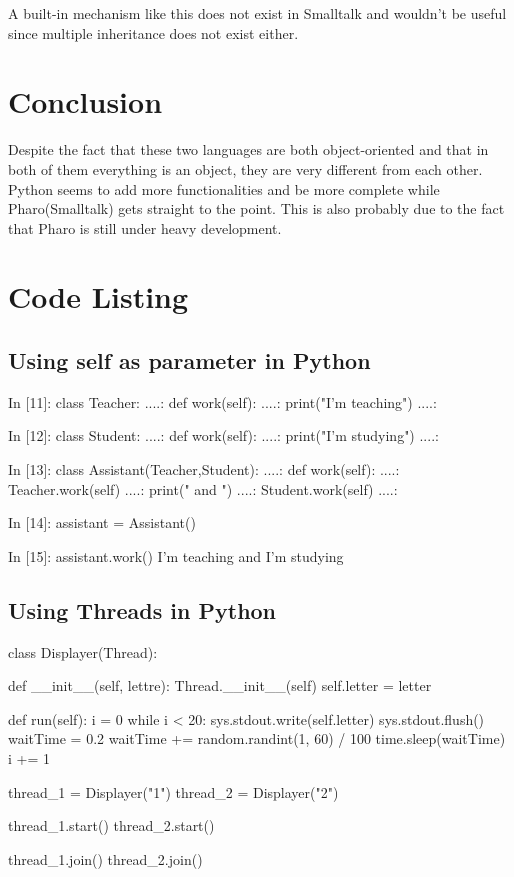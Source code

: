 \documentclass[12pt,a4paper]{scrartcl}
\newcommand\blankpage{%
    \null
    \thispagestyle{empty}%
    \addtocounter{page}{-1}%
    \newpage}
\begin{document}
\begin{multicols}{2}
A built-in mechanism like this does not exist in Smalltalk and wouldn't be useful since multiple inheritance does not exist either.

\pagebreak{}
\section{Conclusion}
Despite the fact that these two languages are both object-oriented and that in both of them everything is an object, they are very different from each other. Python seems to add more functionalities and be more complete while Pharo(Smalltalk) gets straight to the point. This is also probably due to the fact that Pharo is still under heavy development.
\end{multicols}

\pagebreak{}
\blankpage{}
\section {Code Listing}
\subsection{Using self as parameter in Python}
\label{code:pythonSelf}
\begin{python}
In [11]: class Teacher:
   ....:     def work(self):
   ....:         print("I'm teaching")
   ....:         

In [12]: class Student:
   ....:     def work(self):
   ....:         print("I'm studying")
   ....:         

In [13]: class Assistant(Teacher,Student):
   ....:     def work(self):
   ....:         Teacher.work(self)
   ....:         print(" and ")
   ....:         Student.work(self)
   ....:         

In [14]: assistant = Assistant()

In [15]: assistant.work()
I'm teaching
 and 
I'm studying
\end{python}

\subsection{Using Threads in Python}
\label{code:pythonThreads}
\begin{python}
class Displayer(Thread):


    def __init__(self, lettre):
        Thread.__init__(self)
        self.letter = letter

    def run(self):
        i = 0
        while i < 20:
            sys.stdout.write(self.letter)
            sys.stdout.flush()
            waitTime = 0.2
            waitTime += random.randint(1, 60) / 100
            time.sleep(waitTime)
            i += 1

thread_1 = Displayer("1")
thread_2 = Displayer("2")

thread_1.start()
thread_2.start()

thread_1.join()
thread_2.join()
\end{python}
\end{document}
